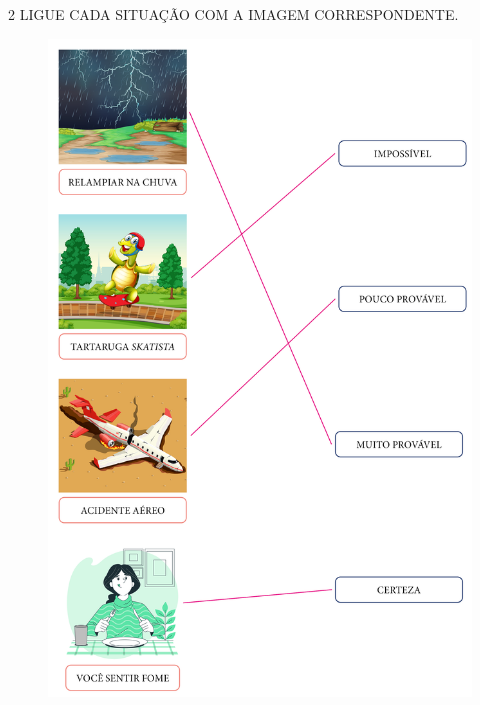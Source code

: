 
\pagebreak

\num{2} LIGUE CADA SITUAÇÃO COM A IMAGEM CORRESPONDENTE.


\begin{figure}[H]
\centering
\includegraphics[width=.9\textwidth]{./media/SAEB_1ANO_MAT_FIGURA86.png}
\end{figure}

